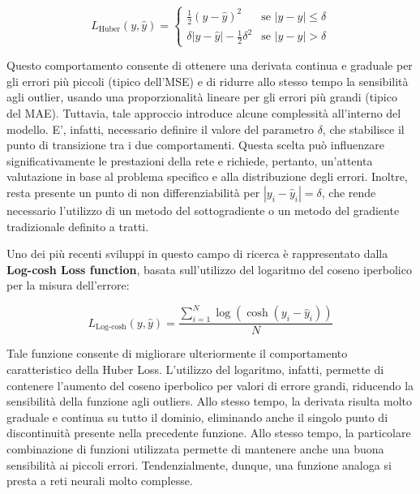     \begin{equation}
        L_{\text{Huber}} (y, \hat{y}) = \begin{cases}
            \displaystyle \frac{1}{2}(y - \hat{y})^2 & \text{se } |y - \hat{y}| \leq \delta\\
            \delta |y - \hat{y}| - \displaystyle \frac{1}{2}\delta^2 & \text{se } |y - \hat{y}| > \delta
        \end{cases}
        \label{eq:Huber}
    \end{equation}

Questo comportamento consente di ottenere una derivata continua e graduale per gli errori più piccoli (tipico dell'MSE) e di ridurre allo stesso tempo la sensibilità agli outlier, usando una proporzionalità lineare per gli errori più grandi (tipico del MAE). Tuttavia, tale approccio introduce alcune complessità all'interno del modello. E', infatti, necessario definire il valore del parametro $\delta$, che stabilisce il punto di transizione tra i due comportamenti. Questa scelta può influenzare significativamente le prestazioni della rete e richiede, pertanto, un'attenta valutazione in base al problema specifico e alla distribuzione degli errori. Inoltre, resta presente un punto di non differenziabilità per $|y_{i} - \hat{y}_{i}| = \delta$, che rende necessario l'utilizzo di un metodo del sottogradiente o un metodo del gradiente tradizionale definito a tratti.

Uno dei più recenti sviluppi in questo campo di ricerca è rappresentato dalla \textbf{Log-cosh Loss function}, basata sull'utilizzo del logaritmo del coseno iperbolico per la misura dell'errore:

    \begin{equation}
        L_{\text{Log-cosh}} (y, \hat{y}) = \displaystyle \frac{\sum_{i=1}^{N} \log(\cosh(y_i - \hat{y}_i))}{N}
    \end{equation}

Tale funzione consente di migliorare ulteriormente il comportamento caratteristico della Huber Loss. L'utilizzo del logaritmo, infatti, permette di contenere l'aumento del coseno iperbolico per valori di errore grandi, riducendo la sensibilità della funzione agli outliers. Allo stesso tempo, la derivata risulta molto graduale e continua su tutto il dominio, eliminando anche il singolo punto di discontinuità presente nella precedente funzione. Allo stesso tempo, la particolare combinazione di funzioni utilizzata permette di mantenere anche una buona sensibilità ai piccoli errori. Tendenzialmente, dunque, una funzione analoga si presta a reti neurali molto complesse.

